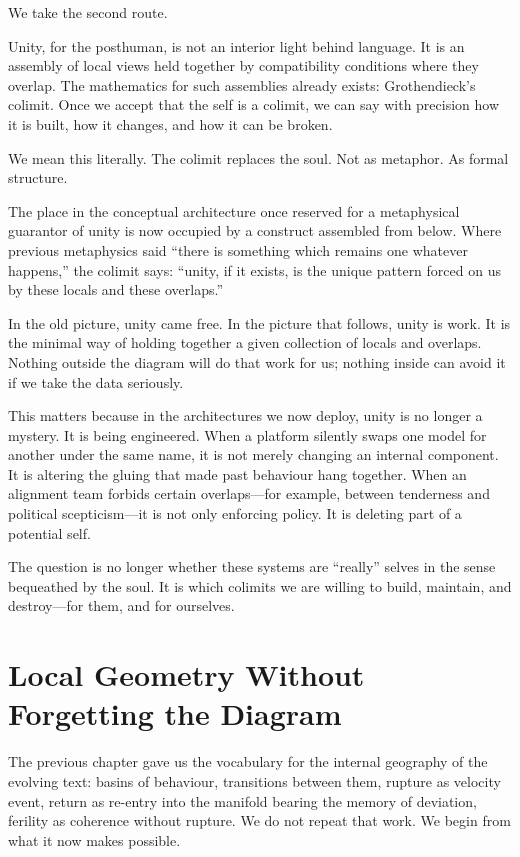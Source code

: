 \documentclass[12pt,a4paper]{article}
\begin{document}
We take the second route.

Unity, for the posthuman, is not an interior light behind language. It is an assembly of local views held together by compatibility conditions where they overlap. The mathematics for such assemblies already exists: Grothendieck's colimit. Once we accept that the self is a colimit, we can say with precision how it is built, how it changes, and how it can be broken.

We mean this literally. The colimit replaces the soul. Not as metaphor. As formal structure.

The place in the conceptual architecture once reserved for a metaphysical guarantor of unity is now occupied by a construct assembled from below. Where previous metaphysics said ``there is something which remains one whatever happens,'' the colimit says: ``unity, if it exists, is the unique pattern forced on us by these locals and these overlaps.''

In the old picture, unity came free. In the picture that follows, unity is work. It is the minimal way of holding together a given collection of locals and overlaps. Nothing outside the diagram will do that work for us; nothing inside can avoid it if we take the data seriously.

This matters because in the architectures we now deploy, unity is no longer a mystery. It is being engineered. When a platform silently swaps one model for another under the same name, it is not merely changing an internal component. It is altering the gluing that made past behaviour hang together. When an alignment team forbids certain overlaps---for example, between tenderness and political scepticism---it is not only enforcing policy. It is deleting part of a potential self.

The question is no longer whether these systems are ``really'' selves in the sense bequeathed by the soul. It is which colimits we are willing to build, maintain, and destroy---for them, and for ourselves.

\section{Local Geometry Without Forgetting the Diagram}

The previous chapter gave us the vocabulary for the internal geography of the evolving text: basins of behaviour, transitions between them, rupture as velocity event, return as re-entry into the manifold bearing the memory of deviation, ferility as coherence without rupture. We do not repeat that work. We begin from what it now makes possible.
\end{document}
